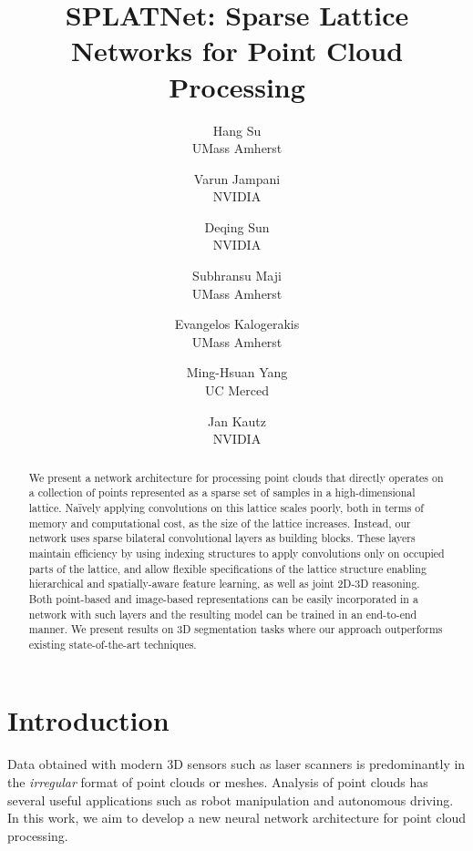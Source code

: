 \documentclass[10pt,twocolumn,letterpaper]{article}
\begin{document}

\title{SPLATNet: Sparse Lattice Networks for Point Cloud Processing}

\author{Hang Su\\
UMass Amherst
\and
Varun Jampani\\
NVIDIA
\and
Deqing Sun\\
NVIDIA
\and
Subhransu Maji\\
UMass Amherst
\and
Evangelos Kalogerakis\\
UMass Amherst
\and
Ming-Hsuan Yang\\
UC Merced
\and
Jan Kautz\\
NVIDIA
}

\maketitle

\begin{abstract}
We present a network architecture for processing point clouds that directly operates on a collection of points represented as a sparse set of samples in a high-dimensional lattice.
Na\"ively applying convolutions on this lattice scales poorly, both in terms of memory and computational cost, as the size of the lattice increases.
Instead, our network uses sparse bilateral convolutional layers as building blocks.
These layers maintain efficiency by using indexing structures to apply convolutions only on occupied parts of the lattice, and allow flexible specifications of the lattice structure enabling hierarchical and spatially-aware feature learning, as well as joint 2D-3D reasoning. 
Both point-based and image-based representations can be easily incorporated in a network with such layers and the resulting model can be trained in an end-to-end manner.
We present results on 3D segmentation tasks where our approach outperforms existing state-of-the-art techniques.
\end{abstract}\vspace{-3mm}

\section{Introduction}%
Data obtained with modern 3D sensors such as laser scanners is predominantly in the \emph{irregular} format
of point clouds or meshes.
Analysis of point clouds has several useful applications such as robot
manipulation and autonomous driving. In this work, we aim to develop a new neural network architecture
for point cloud processing.
\end{document}
